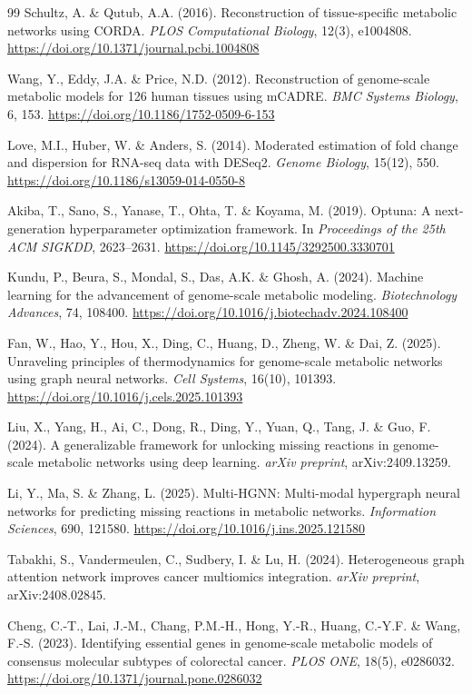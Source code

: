 \documentclass[12pt,a4paper]{article}
\begin{document}
\begin{thebibliography}{99}
 Schultz, A. \& Qutub, A.A. (2016). Reconstruction of tissue-specific metabolic networks using CORDA. \textit{PLOS Computational Biology}, 12(3), e1004808. \url{https://doi.org/10.1371/journal.pcbi.1004808}

 Wang, Y., Eddy, J.A. \& Price, N.D. (2012). Reconstruction of genome-scale metabolic models for 126 human tissues using mCADRE. \textit{BMC Systems Biology}, 6, 153. \url{https://doi.org/10.1186/1752-0509-6-153}

 Love, M.I., Huber, W. \& Anders, S. (2014). Moderated estimation of fold change and dispersion for RNA-seq data with DESeq2. \textit{Genome Biology}, 15(12), 550. \url{https://doi.org/10.1186/s13059-014-0550-8}

 Akiba, T., Sano, S., Yanase, T., Ohta, T. \& Koyama, M. (2019). Optuna: A next-generation hyperparameter optimization framework. In \textit{Proceedings of the 25th ACM SIGKDD}, 2623--2631. \url{https://doi.org/10.1145/3292500.3330701}

 Kundu, P., Beura, S., Mondal, S., Das, A.K. \& Ghosh, A. (2024). Machine learning for the advancement of genome-scale metabolic modeling. \textit{Biotechnology Advances}, 74, 108400. \url{https://doi.org/10.1016/j.biotechadv.2024.108400}

 Fan, W., Hao, Y., Hou, X., Ding, C., Huang, D., Zheng, W. \& Dai, Z. (2025). Unraveling principles of thermodynamics for genome-scale metabolic networks using graph neural networks. \textit{Cell Systems}, 16(10), 101393. \url{https://doi.org/10.1016/j.cels.2025.101393}

 Liu, X., Yang, H., Ai, C., Dong, R., Ding, Y., Yuan, Q., Tang, J. \& Guo, F. (2024). A generalizable framework for unlocking missing reactions in genome-scale metabolic networks using deep learning. \textit{arXiv preprint}, arXiv:2409.13259.

 Li, Y., Ma, S. \& Zhang, L. (2025). Multi-HGNN: Multi-modal hypergraph neural networks for predicting missing reactions in metabolic networks. \textit{Information Sciences}, 690, 121580. \url{https://doi.org/10.1016/j.ins.2025.121580}

 Tabakhi, S., Vandermeulen, C., Sudbery, I. \& Lu, H. (2024). Heterogeneous graph attention network improves cancer multiomics integration. \textit{arXiv preprint}, arXiv:2408.02845.

 Cheng, C.-T., Lai, J.-M., Chang, P.M.-H., Hong, Y.-R., Huang, C.-Y.F. \& Wang, F.-S. (2023). Identifying essential genes in genome-scale metabolic models of consensus molecular subtypes of colorectal cancer. \textit{PLOS ONE}, 18(5), e0286032. \url{https://doi.org/10.1371/journal.pone.0286032}


\end{thebibliography}
\end{document}
